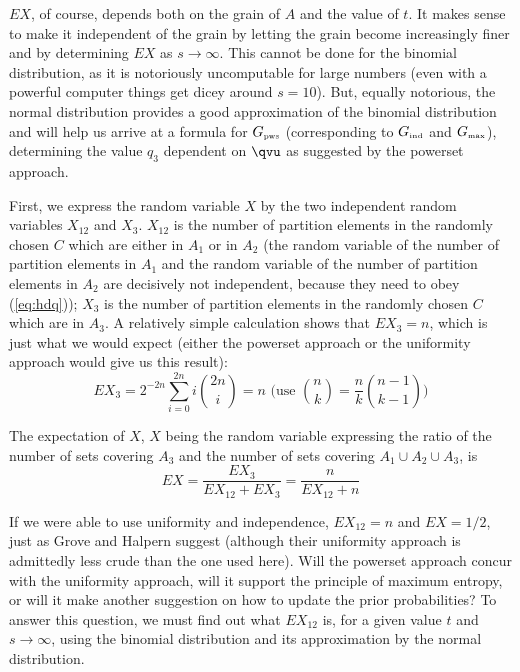 \documentclass[phd,12pt,oneside]{ubcthesis}
\begin{document}
$EX$, of course, depends both on the grain of $A$ and the value of
$t$. It makes sense to make it independent of the grain by letting the
grain become increasingly finer and by determining $EX$ as
$s\rightarrow\infty$. This cannot be done for the binomial
distribution, as it is notoriously uncomputable for large numbers
(even with a powerful computer things get dicey around $s=10$). But,
equally notorious, the normal distribution provides a good
approximation of the binomial distribution and will help us arrive at
a formula for $G_{\mbox{\tiny pws}}$ (corresponding to 
$G_{\mbox{\tiny ind}}$ and $G_{\mbox{\tiny max}}$), determining the value $q_{3}$
dependent on ${\qvu}$ as suggested by the powerset approach.

First, we express the random variable $X$ by the two independent
random variables $X_{12}$ and $X_{3}$. $X_{12}$ is the number of
partition elements in the randomly chosen $C$ which are either in
$A_{1}$ or in $A_{2}$ (the random variable of the number of partition
elements in $A_{1}$ and the random variable of the number of partition
elements in $A_{2}$ are decisively not independent, because they need
to obey ({\ref{eq:hdq}})); $X_{3}$ is the number of partition elements
in the randomly chosen $C$ which are in $A_{3}$. A relatively simple
calculation shows that $EX_{3}=n$, which is just what we would expect
(either the powerset approach or the uniformity approach would give us
this result):
\begin{equation}
  \label{eq:kuquoosu}
  EX_{3}=2^{-2n}\sum_{i=0}^{2n}i\binom{2n}{i}=n\mbox{ (use }\binom{n}{k}=\frac{n}{k}\binom{n-1}{k-1}\mbox{)}
\end{equation}

{\noindent}The expectation of $X$, $X$ being the random variable
expressing the ratio of the number of sets covering $A_{3}$ and the
number of sets covering $A_{1}\cup{}A_{2}\cup{}A_{3}$, is
\begin{equation}
  \label{eq:jahbohgh}
  EX=\frac{EX_{3}}{EX_{12}+EX_{3}}=\frac{n}{EX_{12}+n}
\end{equation}

If we were able to use uniformity and independence, $EX_{12}=n$ and
$EX=1/2$, just as Grove and Halpern suggest (although their uniformity
approach is admittedly less crude than the one used here). Will the
powerset approach concur with the uniformity approach, will it support
the principle of maximum entropy, or will it make another suggestion
on how to update the prior probabilities? To answer this question, we
must find out what $EX_{12}$ is, for a given value $t$ and
$s\rightarrow\infty$, using the binomial distribution and its
approximation by the normal distribution.
\end{document}
